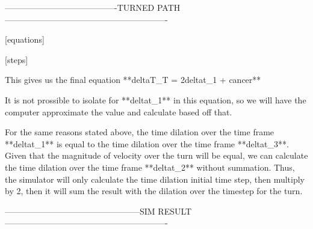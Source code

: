 ----------------------------------------TURNED PATH----------------------------------------------------------

[equations]


[steps]

This gives us the final equation **deltaT_T = 2deltat_1 + cancer**

It is not prossible to isolate for **deltat_1** in this equation, so we will have the computer approximate the value and calculate based
off that.

For the same reasons stated above, the time dilation over the time frame **deltat_1** is equal to the time dilation over the time frame
**deltat_3**. Given that the magnitude of velocity over the turn will be equal, we can calculate the time dilation over the time frame
**deltat_2** without summation. Thus, the simulator will only calculate the time dilation initial time step, then multiply by 2, then 
it will sum the result with the dilation over the timestep for the turn.

------------------------------------------------SIM RESULT----------------------------------------------------------
